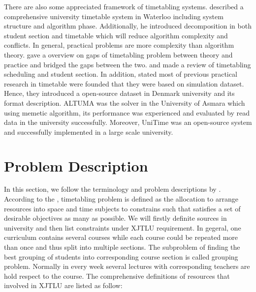 \documentclass{article}
\begin{document}
There are also some appreciated framework of timetabling systems. \cite{(carter2000)comprehensive} described a comprehensive university timetable system in Waterloo including system structure and algorithm phase. Additionally, he introduced decomposition in both student section and timetable which will reduce algorithm complexity and conflicts. In general, practical problems are more complexity than algorithm theory. \cite{(mccollum2006)perspective} gave a overview on gaps of timetabling problem between theory and practice and bridged the gaps between the two.  \cite{(kristiansen2013)comprehensive} and \cite{(johnes2015)operational} made a review of timetabling scheduling and student section. In addition, \cite{(kristiansen2013)comprehensive} stated most of previous practical research in timetable were founded that they were based on simulation dataset. Hence, they introduced a open-source dataset in Denmark university and its format description. ALTUMA \citep{(tesfaldet2008)automated} was the solver in the University of Asmara which using memetic algorithm, its performance was experienced and evaluated by read data in the university successfully. Moreover, UniTime \citep{(muller2016)reallife} was an open-source system and successfully implemented in a large scale university.


\newpage

\section{Problem Description}
\label{sec: Problem Description}

In this section, we follow the terminology and problem descriptions by \cite{(werra1985)introduction}. According to the \cite{(wren1996)scheduling}, timetabling problem is defined as the allocation to arrange resources into space and time subjects to constrains such that satisfies a set of desirable objectives as many as possible. We will firstly definite sources in university and then list constraints under XJTLU requirement. In gegeral, one curriculum contains several courses while each course could be repeated more than once and thus split into multiple sections. The subproblem of finding the best grouping of students into corresponding course section is called grouping problem. Normally in every week several lectures with corresponding teachers are hold respect to the course. The comprehensive definitions of resources that involved in XJTLU are listed as follow:
\end{document}
